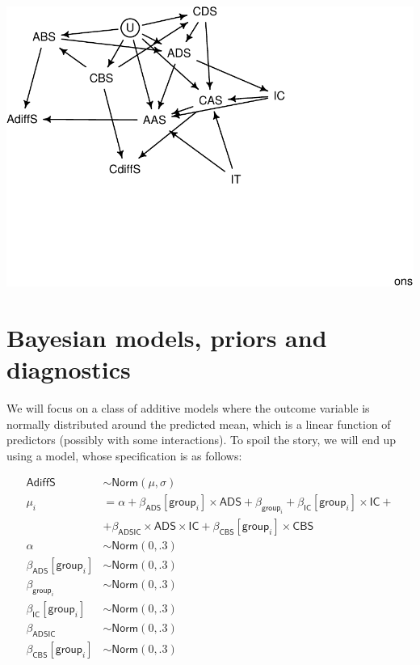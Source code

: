 \documentclass[10pt,dvipsnames,enabledeprecatedfontcommands]{scrartcl}
\begin{document}
\begin{center}\includegraphics[width=1\linewidth]{bayesianReport_files/figure-latex/dag2-1} \end{center}

\section{Bayesian models, priors and
diagnostics}\label{bayesian-models-priors-and-diagnostics}

We will focus on a class of additive models where the outcome variable
is normally distributed around the predicted mean, which is a linear
function of predictors (possibly with some interactions). To spoil the
story, we will end up using a model, whose specification is as follows:

\begin{align*}
\mathsf{AdiffS} & \sim \textsf{Norm}(\mu, \sigma)\\
\mu_i & = \alpha + \beta_{\mathsf{ADS}}[\mathsf{group}_i]\times \mathsf{ADS} + \beta_{\mathsf{group}_i}  +
 \beta_{\mathsf{IC}}[\mathsf{group}_i]\times \mathsf{IC} + \\
 & + \beta_{\mathsf{ADSIC}}\times \mathsf{ADS} \times \mathsf{IC} + \beta_{\mathsf{CBS}}[\mathsf{group}_i] \times \mathsf{CBS}\\
 \alpha & \sim \textsf{Norm}(0,.3)\\
\beta_{\mathsf{ADS}}[\mathsf{group}_i] & \sim \textsf{Norm}(0,.3)\\
\beta_{\mathsf{group}_i} & \sim \textsf{Norm}(0,.3)\\
\beta_{\mathsf{IC}}[\mathsf{group}_i] & \sim \textsf{Norm}(0,.3)\\
 \beta_{\mathsf{ADSIC}} & \sim \textsf{Norm}(0,.3)\\
 \beta_{\mathsf{CBS}}[\mathsf{group}_i]& \sim \textsf{Norm}(0,.3)\\
\end{align*}
\end{document}
